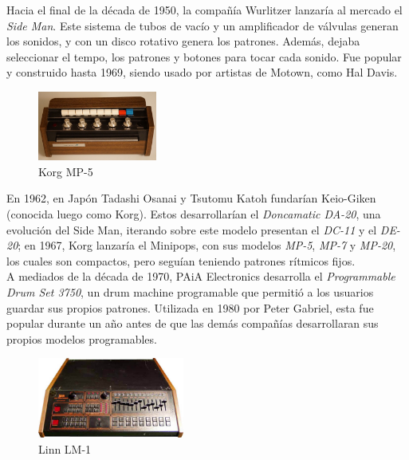 \documentclass{article}
\begin{document}
\endgroup

Hacia el final de la década de 1950, la compañía Wurlitzer lanzaría al mercado el \emph{Side Man}. Este sistema de tubos de vacío y un amplificador de válvulas generan los sonidos, y con un disco rotativo genera los patrones. Además, dejaba seleccionar el tempo, los patrones y botones para tocar cada sonido. Fue popular y construido hasta 1969, siendo usado por artistas de Motown, como Hal Davis.\cite{drumbook}\\

\begingroup
\setlength{\intextsep}{0pt}%
\setlength{\columnsep}{0pt}%

\begin{figure}
    \centering
    \includegraphics[width=0.35\textwidth]{images/mp5.jpg}
    \vspace{-5pt}
    \caption{Korg MP-5}
\end{figure}

En 1962, en Japón Tadashi Osanai y Tsutomu Katoh fundarían Keio-Giken (conocida luego como Korg). Estos desarrollarían el \emph{Doncamatic DA-20}, una evolución del Side Man, iterando sobre este modelo presentan el \emph{DC-11} y el \emph{DE-20}; en 1967, Korg lanzaría el Minipops, con sus modelos \emph{MP-5}, \emph{MP-7} y \emph{MP-20}, los cuales son compactos, pero seguían teniendo patrones rítmicos fijos.\cite{drumbook}\\

A mediados de la década de 1970, PAiA Electronics desarrolla el \emph{Programmable Drum Set 3750}, un drum machine programable que permitió a los usuarios guardar sus propios patrones. Utilizada en 1980 por Peter Gabriel, esta fue popular durante un año antes de que las demás compañías desarrollaran sus propios modelos programables.\cite{14drums}\cite{drumbook}\\

\endgroup

\begingroup
\setlength{\intextsep}{0pt}%
\setlength{\columnsep}{0pt}%

\begin{figure}
    \centering
    \includegraphics[width=0.43\textwidth]{images/linn.jpg}
    \vspace{-5pt}
    \caption{Linn LM-1}
\end{figure}
\end{document}
